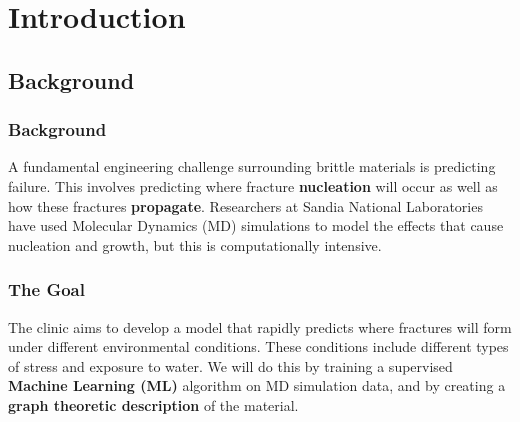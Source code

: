 \section{Introduction}
\subsection{Background}
\frame
{
\frametitle{Background}
\begin{block}{}
A fundamental engineering challenge surrounding brittle materials is predicting failure. This involves predicting where fracture \textbf{nucleation} will occur as well as how these fractures \textbf{propagate}.
\newline
\newline
Researchers at Sandia National Laboratories have used Molecular Dynamics (MD) simulations to model the effects that cause nucleation and growth, but this is computationally intensive.
\end{block}
}



\frame
{
\frametitle{The Goal}
\begin{block}{}
The clinic aims to develop a model that rapidly predicts where fractures will form under different environmental conditions. These conditions include different types of stress and exposure to water.
\newline
\newline
We will do this by training a supervised \textbf{Machine Learning (ML)} algorithm on MD simulation data, and by creating a \textbf{graph theoretic description} of the material.
\end{block}
}


